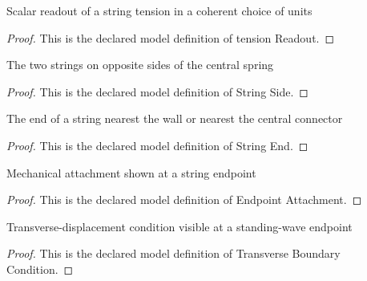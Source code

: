 \begin{definition}
  \label{def:physics:phyx-mini-0182:phyxminiproblems-problemphyxmini0182-tensionreadout}
  Scalar readout of a string tension in a coherent choice of units
\end{definition}
\begin{proof}
  This is the declared model definition of tension Readout.
\end{proof}
\begin{definition}
  \label{def:physics:phyx-mini-0182:phyxminiproblems-problemphyxmini0182-stringside}
  The two strings on opposite sides of the central spring
\end{definition}
\begin{proof}
  This is the declared model definition of String Side.
\end{proof}
\begin{definition}
  \label{def:physics:phyx-mini-0182:phyxminiproblems-problemphyxmini0182-stringend}
  The end of a string nearest the wall or nearest the central connector
\end{definition}
\begin{proof}
  This is the declared model definition of String End.
\end{proof}
\begin{definition}
  \label{def:physics:phyx-mini-0182:phyxminiproblems-problemphyxmini0182-endpointattachment}
  Mechanical attachment shown at a string endpoint
\end{definition}
\begin{proof}
  This is the declared model definition of Endpoint Attachment.
\end{proof}
\begin{definition}
  \label{def:physics:phyx-mini-0182:phyxminiproblems-problemphyxmini0182-transverseboundarycondition}
  Transverse-displacement condition visible at a standing-wave endpoint
\end{definition}
\begin{proof}
  This is the declared model definition of Transverse Boundary Condition.
\end{proof}

